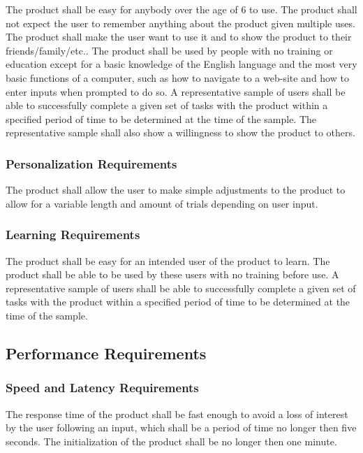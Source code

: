 \documentclass[12pt, titlepage]{article}
\begin{document}
The product shall be easy for anybody over the age of 6 to use. The product shall not expect the user to remember anything about the product given multiple uses. The product shall make the user want to use it and to show the product to their friends/family/etc.. The product shall be used by people with no training or education except for a basic knowledge of the English language and the most very basic functions of a computer, such as how to navigate to a web-site and how to enter inputs when prompted to do so. A representative sample of users shall be able to successfully complete a given set of tasks with the product within a specified period of time to be determined at the time of the sample. The representative sample shall also show a willingness to show the product to others.

\subsubsection{Personalization Requirements}

The product shall allow the user to make simple adjustments to the product to allow for a variable length and amount of trials depending on user input. 

\subsubsection{Learning Requirements}

The product shall be easy for an intended user of the product to learn. The product shall be able to be used by these users with no training before use. A representative sample of users shall be able to successfully complete a given set of tasks with the product within a specified period of time to be determined at the time of the sample.

\subsection{Performance Requirements}

\subsubsection{Speed and Latency Requirements}

The response time of the product shall be fast enough to avoid a loss of interest by the user following an input, which shall be a period of time no longer then five seconds. The initialization of the product shall be no longer then one minute.
\end{document}
